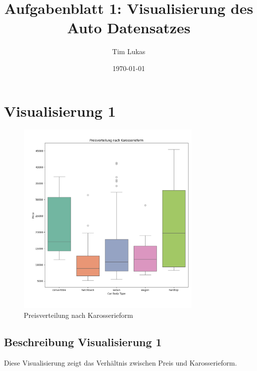 \documentclass[a4paper,12pt]{article}
\title{Aufgabenblatt 1: Visualisierung des Auto Datensatzes}
\author{Tim Lukas}
\date{\today}
\begin{document}
\maketitle

\section{Visualisierung 1}
\begin{figure}[H]
    \centering
    \includegraphics[width=0.8\textwidth]{../images/preisverteilung_nach_karrosserie.png} %
    \caption{Preisverteilung nach Karosserieform}
    \label{fig:vis1}
\end{figure}

\subsection*{Beschreibung Visualisierung 1}
Diese Visualisierung zeigt das Verhältnis zwischen Preis und Karosserieform.

\end{document}
